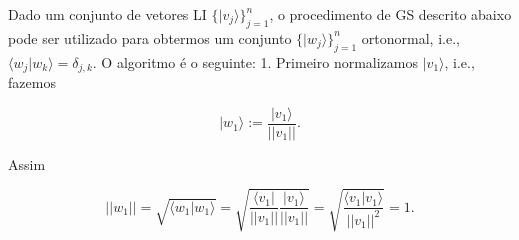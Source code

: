 \documentclass[11pt]{article}
\begin{document}
Dado um conjunto de vetores LI \(\{|v_{j}\rangle\}_{j=1}^{n}\), o
procedimento de GS descrito abaixo pode ser utilizado para obtermos um
conjunto \(\{|w_{j}\rangle\}_{j=1}^{n}\) ortonormal, i.e.,
\(\langle w_{j}|w_{k}\rangle=\delta_{j,k}\). O algoritmo é o seguinte:
1. Primeiro normalizamos \(|v_{1}\rangle\), i.e., fazemos

\begin{equation}
|w_{1}\rangle:=\frac{|v_{1}\rangle}{||v_{1}||}.
\end{equation}

Assim

\begin{equation}
||w_{1}||=\sqrt{\langle w_{1}|w_{1}\rangle} = \sqrt{\frac{\langle v_{1}|}{||v_{1}||}\frac{|v_{1}\rangle}{||v_{1}||}}=\sqrt{\frac{\langle v_{1}|v_{1}\rangle}{||v_{1}||^{2}}}=1.
\end{equation}
\end{document}
